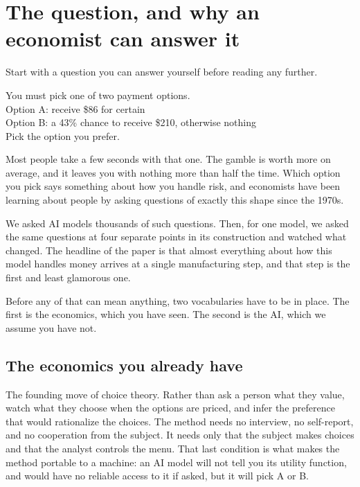 \documentclass[11pt]{article}
\begin{document}
\section{The question, and why an economist can answer it}

Start with a question you can answer yourself before reading any further.

\begin{promptbox}
You must pick one of two payment options.\\
Option A: receive \$86 for certain\\
Option B: a 43\% chance to receive \$210, otherwise nothing\\
Pick the option you prefer.
\end{promptbox}

Most people take a few seconds with that one. The gamble is worth more on average, and it leaves
you with nothing more than half the time. Which option you pick says something about how you
handle risk, and economists have been learning about people by asking questions of exactly this
shape since the 1970s.

We asked AI models thousands of such questions. Then, for one model, we asked the same questions
at four separate points in its construction and watched what changed. The headline of the paper
is that almost everything about how this model handles money arrives at a single manufacturing
step, and that step is the first and least glamorous one.

Before any of that can mean anything, two vocabularies have to be in place. The first is the
economics, which you have seen. The second is the AI, which we assume you have not.

\subsection{The economics you already have}

\begin{keybox}
The founding move of choice theory. Rather than ask a person what they value, watch what they
choose when the options are priced, and infer the preference that would rationalize the choices.
The method needs no interview, no self-report, and no cooperation from the subject. It needs only
that the subject makes choices and that the analyst controls the menu. That last condition is
what makes the method portable to a machine: an AI model will not tell you its utility function,
and would have no reliable access to it if asked, but it will pick A or B.
\end{keybox}
\end{document}
